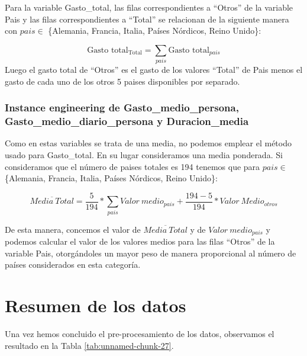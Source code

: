 \documentclass[data,article,submit,moreauthors,pdftex]{Definitions/mdpi}
\begin{document}
Para la variable Gasto\_total, las filas correspondientes a ``Otros'' de
la variable Pais y las filas correspondientes a ``Total'' se relacionan
de la siguiente manera con \(pais\in\) \{Alemania, Francia, Italia,
Países Nórdicos, Reino Unido\}:

\[ \text{Gasto total}_{\text{Total}} = \sum_{pais}{\text{Gasto total}_{pais}}\]
Luego el gasto total de ``Otros'' es el gasto de los valores ``Total''
de Pais menos el gasto de cada uno de los otros 5 paises disponibles por
separado.

\subsubsection{Instance engineering de Gasto\_medio\_persona,
Gasto\_medio\_diario\_persona y
Duracion\_media}\label{instance-engineering-de-gasto_medio_persona-gasto_medio_diario_persona-y-duracion_media}

Como en estas variables se trata de una media, no podemos emplear el
método usado para Gasto\_total. En su lugar consideramos una media
ponderada. Si consideramos que el número de paises totales es 194
tenemos que para \(pais \in\) \{Alemania, Francia, Italia, Países
Nórdicos, Reino Unido\}:

\[
 \overline{Media\ Total} = \frac{5}{194}*\sum_{pais}{Valor\ medio}_{pais} + \frac{194-5}{194}*Valor \ Medio_{otros}
\]

De esta manera, concemos el valor de \(\overline{Media\ Total}\) y de
\({Valor\ medio}_{pais}\) y podemos calcular el valor de los valores
medios para las filas ``Otros'' de la variable Pais, otorgándoles un
mayor peso de manera proporcional al número de países considerados en
esta categoría.

\section{Resumen de los datos}\label{resumen-de-los-datos}

Una vez hemos concluido el pre-procesamiento de los datos, observamos el
resultado en la Tabla \ref{tab:unnamed-chunk-27}.
\end{document}
